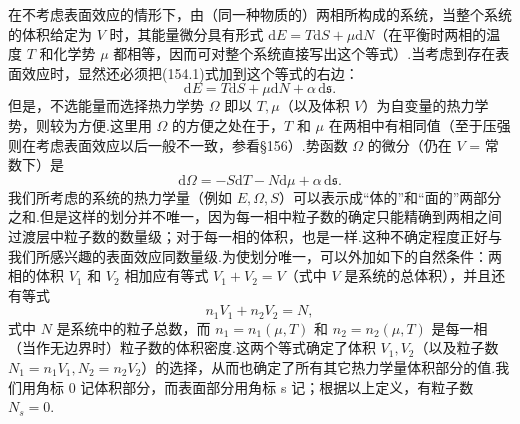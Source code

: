 在不考虑表面效应的情形下，由（同一种物质的）两相所构成的系统，当整个系统的体积给定为 $V$ 时，其能量微分具有形式 $\mathrm{d}E=T\mathrm{d}S+\mu\mathrm{d}N$（在平衡时两相的温度 $T$ 和化学势 $\mu$ 都相等，因而可对整个系统直接写出这个等式）.当考虑到存在表面效应时，显然还必须把(154.1)式加到这个等式的右边：
\begin{equation}
  \mathrm{d}E=T\mathrm{d}S+\mu\mathrm{d}N+\alpha\,\mathrm{d}\mathfrak{s}.
\end{equation}
但是，不选能量而选择热力学势 $\Omega$ 即以 $T,\mu$（以及体积 $V$）为自变量的热力学势，则较为方便.这里用 $\Omega$ 的方便之处在于，$T$ 和 $\mu$ 在两相中有相同值（至于压强则在考虑表面效应以后一般不一致，参看§156）.势函数 $\Omega$ 的微分（仍在 $V$ = 常数下）是
\begin{equation}
  \mathrm{d}\Omega=-S\mathrm{d}T-N\mathrm{d}\mu+\alpha\,\mathrm{d}\mathfrak{s}.
\end{equation}
我们所考虑的系统的热力学量（例如 $E,\Omega,S$）可以表示成“体的”和“面的”两部分之和.但是这样的划分并不唯一，因为每一相中粒子数的确定只能精确到两相之间过渡层中粒子数的数量级；对于每一相的体积，也是一样.这种不确定程度正好与我们所感兴趣的表面效应同数量级.为使划分唯一，可以外加如下的自然条件：两相的体积 $V_1$ 和 $V_2$ 相加应有等式 $V_1+V_2=V$（式中 $V$ 是系统的总体积），并且还有等式
\begin{equation*}
  n_1V_1+n_2V_2=N,
\end{equation*}
式中 $N$ 是系统中的粒子总数，而 $n_1=n_1(\mu,T)$ 和 $n_2=n_2(\mu,T)$ 是每一相（当作无边界时）粒子数的体积密度.这两个等式确定了体积 $V_1,V_2$（以及粒子数 $N_1=n_1V_1,N_2=n_2V_2$）的选择，从而也确定了所有其它热力学量体积部分的值.我们用角标 0 记体积部分，而表面部分用角标 s 记；根据以上定义，有粒子数 $N_s=0$.

